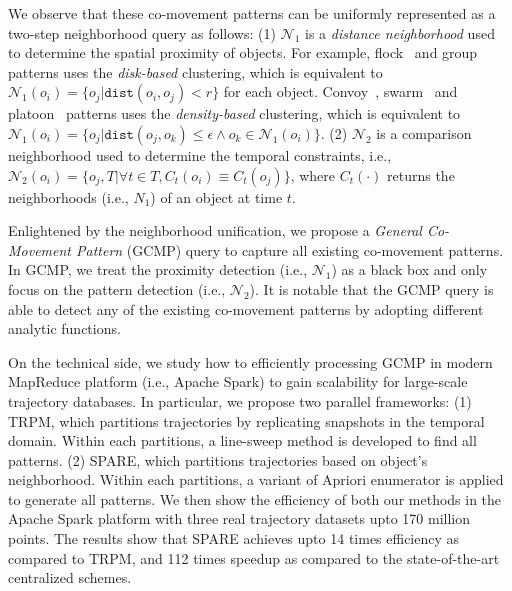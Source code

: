 We observe that 
these co-movement patterns can be uniformly represented as a two-step neighborhood query as follows:
	(1) $\mathcal{N}_1$ is a \emph{distance neighborhood} used to determine the spatial proximity of objects. For example,  flock~\cite{gudmundsson2006computing} and group~\cite{wang2006grouppattern} patterns uses the \emph{disk-based} clustering, which is equivalent to $\mathcal{N}_1(o_i)= \{o_j | \mathtt{dist}(o_i,o_j) < r \}$ for each object. Convoy~\cite{jeung2008discovery}, swarm~\cite{li2010swarm} and platoon~\cite{li2015platoon} patterns uses the \emph{density-based} clustering, which is equivalent to $\mathcal{N}_1(o_i)= \{o_j | \mathtt{dist}(o_j,o_k) \leq \epsilon \wedge o_k \in \mathcal{N}_1(o_i)\}$.
	(2) $\mathcal{N}_2$ is a comparison neighborhood used to determine the temporal constraints, i.e., $\mathcal{N}_2(o_i)=\{o_j, T | \forall t \in T, C_t(o_i) \equiv C_t(o_j)\}$, where $C_t(\cdot)$ returns the neighborhoods (i.e., $N_1$) of an object at time $t$.

Enlightened by the neighborhood unification, we propose a \emph{General Co-Movement Pattern} (GCMP)
query to capture all existing co-movement patterns. In GCMP, we treat the proximity detection (i.e., $\mathcal{N}_1$) as
a black box and only focus on the pattern detection (i.e., $\mathcal{N}_2$). It is notable that the GCMP
query is able to detect any of the existing co-movement patterns by adopting different analytic functions.



On the technical side, we study how to efficiently processing GCMP in modern MapReduce platform (i.e., Apache Spark) to gain scalability for large-scale trajectory databases. In particular, we propose two parallel frameworks: (1) TRPM, which partitions trajectories by replicating snapshots in the temporal domain. Within each partitions, a line-sweep method is developed to find all patterns. (2) SPARE, which partitions trajectories based on object's neighborhood. Within each partitions, a variant of Apriori enumerator is applied to generate all patterns. We then show the efficiency of both our methods in the Apache Spark platform with three real trajectory datasets upto 170 million points. The results show that SPARE achieves upto 14 times efficiency as compared to TRPM, and 112 times speedup as compared to the state-of-the-art centralized schemes.